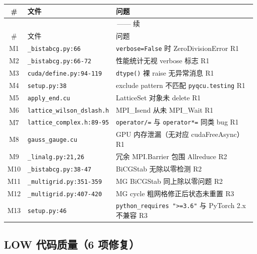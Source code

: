 \documentclass[11pt,a4paper]{article}
\newcommand{\low}{\textcolor{severitylow}{\textbf{LOW}}}
\begin{document}
\begin{longtable}{cll}
\toprule
\# & 文件 & 问题 \\
\midrule
\endfirsthead
\multicolumn{3}{c}{\tablename{} \thetable{} —— 续} \\
\midrule
\# & 文件 & 问题 \\
\midrule
\endhead
\bottomrule
\endfoot
M1 & \texttt{\_bistabcg.py:66} & \texttt{verbose=False} 时 ZeroDivisionError \hfill R1 \\
M2 & \texttt{\_bistabcg.py:66-72} & 性能统计无视 verbose 标志 \hfill R1 \\
M3 & \texttt{cuda/define.py:94-119} & \texttt{dtype()} 裸 raise 无异常消息 \hfill R1 \\
M4 & \texttt{setup.py:38} & exclude pattern 不匹配 \texttt{pyqcu.testing} \hfill R1 \\
M5 & \texttt{apply\_end.cu} & LatticeSet 对象未 delete \hfill R1 \\
M6 & \texttt{lattice\_wilson\_dslash.h} & MPI\_Isend 从未 MPI\_Wait \hfill R1 \\
M7 & \texttt{lattice\_complex.h:89-95} & \texttt{operator/=} 与 \texttt{operator*=} 同类 bug \hfill R1 \\
M8 & \texttt{gauss\_gauge.cu} & GPU 内存泄漏（无对应 cudaFreeAsync）\hfill R1 \\
M9 & \texttt{\_linalg.py:21,26} & 冗余 MPI.Barrier 包围 Allreduce \hfill R2 \\
M10 & \texttt{\_bistabcg.py:38-47} & BiCGStab 无除以零检测 \hfill R2 \\
M11 & \texttt{\_multigrid.py:351-359} & MG BiCGStab 同上除以零问题 \hfill R2 \\
M12 & \texttt{\_multigrid.py:407-420} & MG cycle 粗网格修正后状态未重置 \hfill R3 \\
M13 & \texttt{setup.py:46} & \texttt{python\_requires ">=3.6"} 与 PyTorch 2.x 不兼容 \hfill R3 \\
\end{longtable}

\subsection{\low{} 代码质量（6 项修复）}
\end{document}
